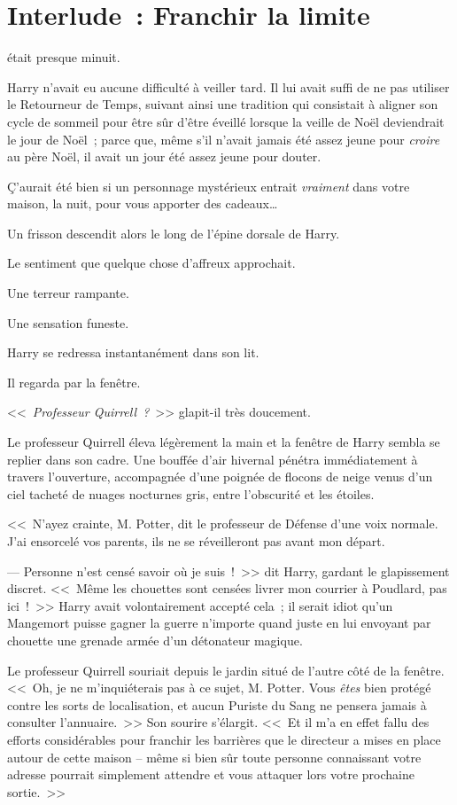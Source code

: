 \chapter{Interlude~: Franchir la limite}

 était presque minuit.

\hplettrineextrapara
Harry n'avait eu aucune difficulté à veiller tard. Il lui avait suffi de ne pas utiliser le Retourneur de Temps, suivant ainsi une tradition qui consistait à aligner son cycle de sommeil pour être sûr d'être éveillé lorsque la veille de Noël deviendrait le jour de Noël~; parce que, même s'il n'avait jamais été assez jeune pour \emph{croire} au père Noël, il avait un jour été assez jeune pour douter.

Ç'aurait été bien si un personnage mystérieux entrait \emph{vraiment} dans votre maison, la nuit, pour vous apporter des cadeaux…

Un frisson descendit alors le long de l'épine dorsale de Harry.

Le sentiment que quelque chose d'affreux approchait.

Une terreur rampante.

Une sensation funeste.

Harry se redressa instantanément dans son lit.

Il regarda par la fenêtre.

<<~\emph{Professeur Quirrell~?}~>> glapit-il très doucement.

Le professeur Quirrell éleva légèrement la main et la fenêtre de Harry sembla se replier dans son cadre. Une bouffée d'air hivernal pénétra immédiatement à travers l'ouverture, accompagnée d'une poignée de flocons de neige venus d'un ciel tacheté de nuages nocturnes gris, entre l'obscurité et les étoiles.

<<~N'ayez crainte, M. Potter, dit le professeur de Défense d'une voix normale. J'ai ensorcelé vos parents, ils ne se réveilleront pas avant mon départ.

--- Personne n'est censé savoir où je suis~!~>> dit Harry, gardant le glapissement discret. <<~Même les chouettes sont censées livrer mon courrier à Poudlard, pas ici~!~>> Harry avait volontairement accepté cela~; il serait idiot qu'un Mangemort puisse gagner la guerre n'importe quand juste en lui envoyant par chouette une grenade armée d'un détonateur magique.

Le professeur Quirrell souriait depuis le jardin situé de l'autre côté de la fenêtre. <<~Oh, je ne m'inquiéterais pas à ce sujet, M. Potter. Vous \emph{êtes} bien protégé contre les sorts de localisation, et aucun Puriste du Sang ne pensera jamais à consulter l'annuaire.~>> Son sourire s'élargit. <<~Et il m'a en effet fallu des efforts considérables pour franchir les barrières que le directeur a mises en place autour de cette maison -- même si bien sûr toute personne connaissant votre adresse pourrait simplement attendre et vous attaquer lors votre prochaine sortie.~>>

